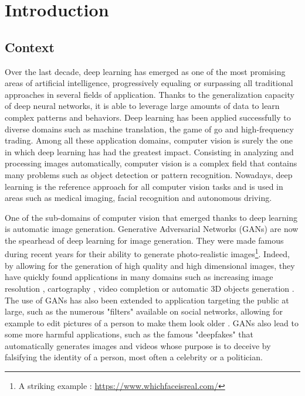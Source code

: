 \chapter*{Introduction}
\label{chap:intro}

\section*{Context}

Over the last decade, deep learning has emerged as one of the most promising areas of artificial intelligence, progressively equaling or surpassing all traditional approaches in several fields of application. Thanks to the generalization capacity of deep neural networks, it is able to leverage large amounts of data to learn complex patterns and behaviors. Deep learning has been applied successfully to diverse domains such as machine translation, the game of go and high-frequency trading. Among all these application domains, computer vision is surely the one in which deep learning has had the greatest impact. Consisting in analyzing and processing images automatically, computer vision is a complex field that contains many problems such as object detection or pattern recognition. Nowadays, deep learning is the reference approach for all computer vision tasks and is used in areas such as medical imaging, facial recognition and autonomous driving.

One of the sub-domains of computer vision that emerged thanks to deep learning is automatic image generation. Generative Adversarial Networks (\ac{GANs}) \citep{Goodfellow2014} are now the spearhead of deep learning for image generation. They were made famous during recent years for their ability to generate photo-realistic images\footnote{A striking example : \url{https://www.whichfaceisreal.com/}}. Indeed, by allowing for the generation of high quality and high dimensional images, they have quickly found applications in many domains such as increasing image resolution \citep{Wang2020}, cartography \citep{Kang2019}, video completion \citep{Vondrick2016} or automatic  3D objects generation \citep{Wu2017}. The use of \ac{GANs} has also been extended to application targeting the public at large, such as the numerous "filters" available on social networks, allowing for example to edit pictures of a person to make them look older \citep{Antipov2017a}. \ac{GANs} also lead to some more harmful applications, such as the famous "deepfakes" \citep{Vaccari2020} that automatically generates images and videos whose purpose is to deceive by falsifying the identity of a person, most often a celebrity or a politician.

